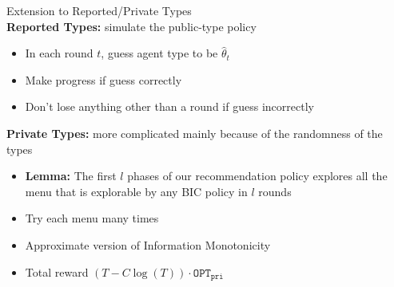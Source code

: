 \documentclass[final]{beamer}
\newlength{\sepwid}
\newlength{\onecolwid}
\newlength{\twocolwid}
\newcommand{\term}[1]{\ensuremath{\mathtt{#1}}}
\def\OPT{\term{OPT}}
\newcommand{\OPTpri}{\OPT_{\term{pri}}}
\begin{document}
\begin{frame}[t]
\begin{columns}[t]
\begin{columns}[t,totalwidth=\twocolwid]
\begin{column}{\onecolwid}
\begin{block}{Extension to Reported/Private Types}
~\\
\textbf{Reported Types:} simulate the public-type policy
\begin{itemize}
\item In each round $t$, guess agent type to be $\hat{\theta}_t$ 
\item Make progress if guess correctly 
\item Don't lose anything other than a round if guess incorrectly
\end{itemize}

\textbf{Private Types:} more complicated mainly because of the randomness of the types
\begin{itemize}
\item \textbf{Lemma:} The first $l$ phases of our recommendation policy explores all the menu that is explorable by any BIC policy in $l$ rounds \\
\item Try each menu many times
\item Approximate version of Information Monotonicity
\item Total reward $(T- C\log(T))\cdot \OPTpri$ 
\end{itemize}


\end{block}



\end{column} %

\end{columns} %


\begin{column}{\sepwid}\end{column} %





\end{columns}
\end{frame}
\end{document}

